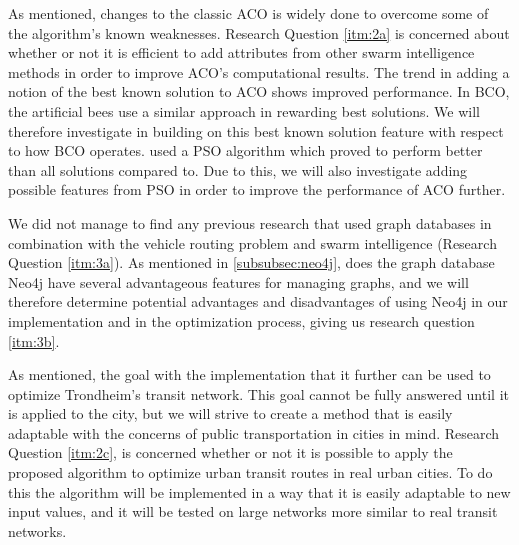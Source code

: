 As mentioned, changes to the classic ACO is widely done to overcome some of the algorithm's known weaknesses.  Research Question \vref{itm:2a} is concerned about whether or not it is efficient to add attributes from other swarm intelligence methods in order to improve ACO's computational results. The trend in adding a notion of the best known solution to ACO shows improved performance. In BCO, the artificial bees use a similar approach in rewarding best solutions. We will therefore investigate in building on this best known solution feature with respect to how BCO operates. \citet{kechagiopoulos14} used a PSO algorithm which proved to perform better than all solutions compared to. Due to this, we will also investigate adding possible features from PSO in order to improve the performance of ACO further. 

We did not manage to find any previous research that used graph databases in combination with the vehicle routing problem and swarm intelligence (Research Question \vref{itm:3a}). As mentioned in \vref{subsubsec:neo4j}, does the graph database Neo4j \citep{website:neo4j} have several advantageous features for managing graphs, and we will therefore determine potential advantages and disadvantages of using Neo4j in our implementation and in the optimization process, giving us research question \vref{itm:3b}.


As mentioned, the goal with the implementation that it further can be used to optimize Trondheim's transit network. This goal cannot be fully answered until it is applied to the city, but we will strive to create a method that is easily adaptable with the concerns of public transportation in cities in mind. Research Question \vref{itm:2c}, is concerned whether or not it is possible to apply the proposed algorithm to optimize urban transit routes in real urban cities. To do this the algorithm will be implemented in a way that it is easily adaptable to new input values, and it will be tested on large networks more similar to real transit networks. 

